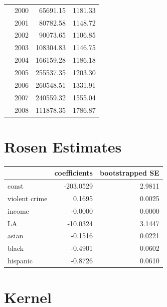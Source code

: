 \documentclass[12pt,a4paper]{article}
\begin{document}
\begin{center}
\begin{tabular}{llrr}
&              2000 &       65691.15 &          1181.33  \\
&              2001 &       80782.58 &          1148.72 \\
&              2002 &      90073.65 &          1106.85 \\
&              2003 &      108304.83 &          1146.75 \\
&              2004 &      166159.28 &          1186.18 \\
&              2005 &    255537.35 &          1203.30  \\
&              2006 &      260548.51 &          1331.91 \\
&              2007 &     240559.32 &          1555.04 \\
&              2008 &      111878.35 &          1786.87 \\
\hline
\hline
\end{tabular}
\end{center}

\section{Rosen Estimates}
\begin{center}
\begin{tabular}{lrr}
\hline
\hline
   &   coefficients &  bootstrapped SE \\
\hline
\hline
const         & -203.0529 &           2.9811 \\
 violent crime &    0.1695 &           0.0025 \\
 income        &   -0.0000 &           0.0000 \\
LA            &  -10.0324 &           3.1447 \\
asian         &   -0.1516 &           0.0221 \\
black         &   -0.4901 &           0.0602 \\
hispanic          &   -0.8726 &           0.0610 \\
\hline
\hline
\end{tabular}
\end{center}

\section{Kernel}
\end{document}
